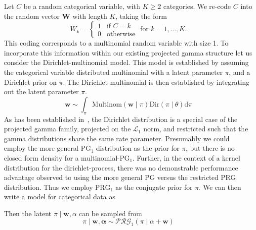   
  


Let $C$ be a random categorical variable, with $K \geq 2$ categories.  We 
    re-code $C$ into the random vector $\bm{W}$ with length $K$, taking the form
    \begin{equation*}
        W_k = \begin{cases}
            1 &\text{if }C = k\\
            0 &\text{otherwise}
            \end{cases} \text{ for }k = 1,\ldots, K.
    \end{equation*}
    This coding corresponds to a multinomial random variable with size 1. To 
    incorporate this information within our existing projected gamma structure
    let us consider the Dirichlet-multinomial model.  This model is established by
    assuming the categorical variable distributed multinomial with a latent 
    parameter $\pi$, and a Dirichlet prior on $\pi$. The Dirichlet-multinomial is 
    then established by integrating out the latent parameter $\pi$. 
    \begin{equation*}
    \bm{w} \sim \int_{\pi} \text{Multinom}(\bm{w}\mid\pi)\text{Dir}(\pi\mid\theta)\text{d}\pi
    \end{equation*}
    As has been established in~\cite{trubey:pg}, the Dirichlet distribution is a 
    special case of the projected gamma family, projected on the $\mathcal{L}_1$ 
    norm, and restricted such that the gamma distributions share the same rate
    parameter. Presumably we could employ the more general $\text{PG}_1$ distribution
    as the prior for $\pi$, but there is no closed form density for a 
    multinomial-$\text{PG}_1$.  Further, in the context of a kernel distribution
    for the dirichlet-process, there was no demonstrable performance advantage 
    observed to using the more general PG versus the restricted PRG distribution.
    Thus we employ $\text{PRG}_1$ as the conjugate prior for $\pi$. We can then 
    write a model for categorical data as 
    
    Then the latent $\pi\mid \bm{w},\alpha$ can be sampled from
    \begin{equation}
        \label{eq:pi_fullcond}
        \pi \mid \bm{w},\bm{\alpha} \sim \mathcal{PRG}_1(\pi\mid\alpha + \bm{w})
    \end{equation}

